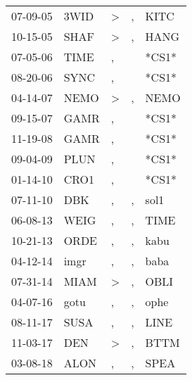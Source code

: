 \begin{supertabular}{lllll}
 07-09-05 &   3WID &  \textgreater &             , &   KITC \\
 10-15-05 &   SHAF &  \textgreater &             , &   HANG \\
 07-05-06 &   TIME &             , &               &  *CS1* \\
 08-20-06 &   SYNC &             , &               &  *CS1* \\
 04-14-07 &   NEMO &  \textgreater &             , &   NEMO \\
 09-15-07 &   GAMR &             , &               &  *CS1* \\
 11-19-08 &   GAMR &             , &               &  *CS1* \\
 09-04-09 &   PLUN &             , &               &  *CS1* \\
 01-14-10 &   CRO1 &             , &               &  *CS1* \\
 07-11-10 &    DBK &             , &             , &   sol1 \\
 06-08-13 &   WEIG &             , &             , &   TIME \\
 10-21-13 &   ORDE &             , &             , &   kabu \\
 04-12-14 &   imgr &             , &             , &   baba \\
 07-31-14 &   MIAM &  \textgreater &             , &   OBLI \\
 04-07-16 &   gotu &             , &             , &   ophe \\
 08-11-17 &   SUSA &             , &             , &   LINE \\
 11-03-17 &    DEN &  \textgreater &             , &   BTTM \\
 03-08-18 &   ALON &             , &             , &   SPEA \\
\end{supertabular}
